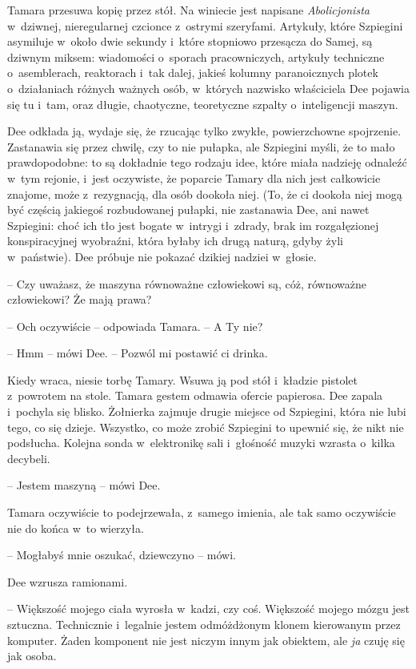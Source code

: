 \documentclass[oneside,polish,11pt,sfheadings]{mwbk}
\begin{document}
Tamara przesuwa kopię przez stół. Na winiecie jest napisane
\emph{Abolicjonista} w~dziwnej, nieregularnej czcionce z~ostrymi
szeryfami. Artykuły, które Szpiegini asymiluje w~około dwie sekundy i~które stopniowo przesącza do Samej, są dziwnym miksem: wiadomości o~sporach pracowniczych, artykuły techniczne o~asemblerach, reaktorach i~tak dalej, jakieś kolumny paranoicznych plotek o~działaniach różnych
ważnych osób, w~których nazwisko właściciela Dee pojawia się tu i~tam,
oraz długie, chaotyczne, teoretyczne szpalty o~inteligencji maszyn.

Dee odkłada ją, wydaje się, że rzucając tylko zwykłe, powierzchowne
spojrzenie. Zastanawia się przez chwilę, czy to nie pułapka, ale
Szpiegini myśli, że to mało prawdopodobne: to są dokładnie tego rodzaju
idee, które miała nadzieję odnaleźć w~tym rejonie, i~jest oczywiste, że
poparcie Tamary dla nich jest całkowicie znajome, może z~rezygnacją, dla
osób dookoła niej. (To, że ci dookoła niej mogą być częścią jakiegoś
rozbudowanej pułapki, nie zastanawia Dee, ani nawet Szpiegini: choć ich
tło jest bogate w~intrygi i~zdrady, brak im rozgałęzionej konspiracyjnej
wyobraźni, która byłaby ich drugą naturą, gdyby żyli w~państwie). Dee
próbuje nie pokazać dzikiej nadziei w~głosie.

-- Czy uważasz, że maszyna równoważne człowiekowi są, cóż, równoważne
człowiekowi? Że mają prawa?

-- Och oczywiście -- odpowiada Tamara. -- A Ty nie?

-- Hmm -- mówi Dee. -- Pozwól mi postawić ci drinka.

Kiedy wraca, niesie torbę Tamary. Wsuwa ją pod stół i~kładzie pistolet z~powrotem na stole. Tamara gestem odmawia ofercie papierosa. Dee zapala i~pochyla się blisko. Żołnierka zajmuje drugie miejsce od Szpiegini, która
nie lubi tego, co się dzieje. Wszystko, co może zrobić Szpiegini to
upewnić się, że nikt nie podsłucha. Kolejna sonda w~elektronikę sali i~głośność muzyki wzrasta o~kilka decybeli.

-- Jestem maszyną -- mówi Dee.

Tamara oczywiście to podejrzewała, z~samego imienia, ale tak samo
oczywiście nie do końca w~to wierzyła.

-- Mogłabyś mnie oszukać, dziewczyno -- mówi.

Dee wzrusza ramionami. 

-- Większość mojego ciała wyrosła w~kadzi, czy
coś. Większość mojego mózgu jest sztuczna. Technicznie i~legalnie jestem
odmóżdżonym klonem kierowanym przez komputer. Żaden komponent nie jest
niczym innym jak obiektem, ale \emph{ja} czuję się jak osoba.
\end{document}

